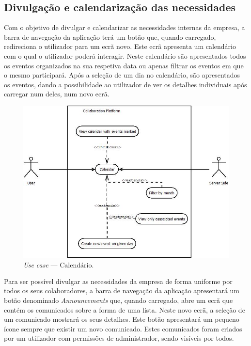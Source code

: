 \subsection{Divulgação e calendarização das necessidades}

Com o objetivo de divulgar e calendarizar as necessidades internas da empresa, a barra de navegação da aplicação terá um botão que, quando carregado, 
redireciona o utilizador para um ecrã novo. 
Este ecrã apresenta um calendário com o qual o utilizador poderá interagir.  
Neste calendário são apresentados todos os eventos organizados na sua respetiva data ou apenas filtrar os eventos em que o mesmo participará. 
Após a seleção de um dia no calendário, são apresentados os eventos, dando a possibilidade ao utilizador de ver os detalhes individuais após carregar num deles, 
num novo ecrã.

\begin{figure}[H]
    \centering
    \includegraphics[scale=0.6]{figures/Calendar use case.jpeg}
    \caption{\textit{Use case} --- Calendário.}\label{fig:uc:calendar}
\end{figure}

Para ser possível divulgar as necessidades da empresa de forma uniforme por todos os seus colaboradores, a barra de navegação da aplicação apresentará 
um botão denominado \textit{Announcements} que, quando carregado, abre um ecrã que contém os comunicados sobre a forma de uma lista. 
Neste novo ecrã, a seleção de um comunicado mostrará os seus detalhes. 
Este botão apresentará um pequeno ícone sempre que existir um novo comunicado. 
Estes comunicados foram criados por um utilizador com permissões de administrador, sendo visíveis por todos.

